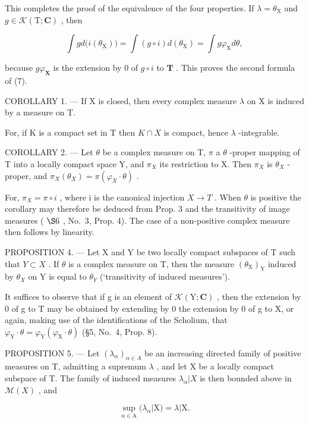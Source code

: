 This completes the proof of the equivalence of the four properties. If \(\lambda = \theta_{\mathrm{X}}\) and \(g\in \mathcal{K}(\mathrm{T};\mathbf{C})\) , then

\[
\int g d \bigl (i (\theta_ {\mathrm{X}}) \bigr) = \int (g \circ i) d (\theta_ {\mathrm{X}}) = \int g \varphi_ {\mathrm{X}} d \theta ,
\]

because \(g\varphi_{\mathbf{X}}\) is the extension by 0 of \(g \circ i\) to \(\mathbf{T}\) . This proves the second formula of (7).

COROLLARY 1. --- If X is closed, then every complex measure \(\lambda\) on X is induced by a measure on T.

For, if K is a compact set in T then \(K \cap X\) is compact, hence \(\lambda\) -integrable.

COROLLARY 2. --- Let \(\theta\) be a complex measure on T, \(\pi\) a \(\theta\) -proper mapping of T into a locally compact space Y, and \(\pi_{X}\) its restriction to X. Then \(\pi_{X}\) is \(\theta_{X}\) -proper, and \(\pi_{X}(\theta_{X}) = \pi(\varphi_{X} \cdot \theta)\) .

For, \(\pi_{X} = \pi \circ i\) , where i is the canonical injection \(X \to T\) . When \(\theta\) is positive the corollary may therefore be deduced from Prop. 3 and the transitivity of image measures ( \(\S6\) , No.~3, Prop. 4). The case of a non-positive complex measure then follows by linearity.

PROPOSITION 4. --- Let X and Y be two locally compact subspaces of T such that \(Y \subset X\) . If \(\theta\) is a complex measure on T, then the measure \((\theta_{\mathrm{X}})_{\mathrm{Y}}\) induced by \(\theta_{X}\) on Y is equal to \(\theta_{Y}\) (`transitivity of induced measures').

It suffices to observe that if g is an element of \(\mathcal{K}(\mathrm{Y};\mathbf{C})\) , then the extension by 0 of g to T may be obtained by extending by 0 the extension by 0 of g to X, or again, making use of the identifications of the Scholium, that \(\varphi_{\mathrm{Y}}\cdot\theta=\varphi_{\mathrm{Y}}(\varphi_{\mathrm{X}}\cdot\theta)\) (§5, No.~4, Prop. 8).

PROPOSITION 5. --- Let \((\lambda_{\alpha})_{\alpha\in A}\) be an increasing directed family of positive measures on T, admitting a supremum \(\lambda\) , and let X be a locally compact subspace of T. The family of induced measures \(\lambda_{\alpha}|X\) is then bounded above in \(\mathcal{M}(X)\) , and

\[
\sup _ {\alpha \in \mathrm{A}} (\lambda_ {\alpha} | \mathrm{X}) = \lambda | \mathrm{X}.\tag{8}
\]

